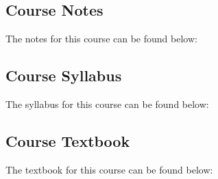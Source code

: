 \subsection{Course Notes}

The notes for this course can be found below: \coursedoc{\CSPBCompSysCourseNotes}

\subsection{Course Syllabus}

The syllabus for this course can be found below: \coursedoc{\CSPBCompSysSyllabus}

\subsection{Course Textbook}

The textbook for this course can be found below: \coursedoc{\CSPBCompSysTextbook}